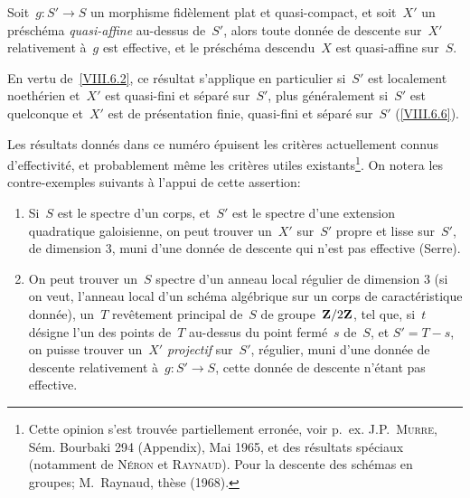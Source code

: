 \begin{corollaire}
\label{VIII.7.9}
Soit~$g\colon S'\to S$ un morphisme fid\`element plat et
quasi-compact, et soit~$X'$ un pr\'esch\'ema \emph{quasi-affine}
au-dessus de~$S'$, alors toute donn\'ee de descente sur~$X'$
relativement \`a~$g$ est effective, et le pr\'esch\'ema
descendu~$X$ est quasi-affine sur~$S$.
\end{corollaire}

En vertu de~\ref{VIII.6.2}, ce r\'esultat s'applique en particulier
si~$S'$ est localement noeth\'erien et~$X'$ est quasi-fini et
s\'epar\'e sur~$S'$, plus g\'en\'eralement si~$S'$ est
quelconque et~$X'$ est de pr\'esentation finie, quasi-fini et
s\'epar\'e sur~$S'$ (\cf \ref{VIII.6.6}).

\begin{remarques}
\label{VIII.7.10}
Les r\'esultats donn\'es dans ce num\'ero \'epuisent les
crit\`eres actuellement connus d'effectivit\'e, et probablement
m\^eme les crit\`eres utiles existants\footnote{Cette opinion
s'est trouv\'ee partiellement erron\'ee, voir p.\, ex. J.P.\, \textsc{Murre},
S\'em. Bourbaki 294 (Appendix), Mai 1965, et des r\'esultats
sp\'eciaux (notamment de \textsc{Néron} et \textsc{Raynaud}). Pour la descente des
sch\'emas en groupes; \cf M.\, Raynaud, th\`ese (1968).}. On notera
les contre-exemples suivants \`a l'appui de cette assertion:
\begin{enumerate}
\item[(i)]
Si~$S$ est le spectre d'un corps, et~$S'$ est le spectre d'une
extension quadratique galoisienne, on peut trouver un~$X'$ sur~$S'$
propre et lisse sur~$S'$, de dimension 3, muni d'une donn\'ee de
descente qui n'est pas effective (Serre).
\item[(ii)] On peut trouver un~$S$ spectre d'un anneau local
r\'egulier de dimension 3 (si on veut, l'anneau local d'un
sch\'ema alg\'ebrique sur un corps de caract\'eristique
donn\'ee), un~$T$ rev\^etement principal de~$S$ de
groupe~$\mathbf{Z}/2\mathbf{Z}$, tel que, si~$t$ d\'esigne l'un des points de~$T$
au-dessus du point ferm\'e~$s$ de~$S$, et $S'=T-s$, on puisse
trouver un~$X'$ \emph{projectif} sur~$S'$, r\'egulier, muni d'une
donn\'ee de descente relativement \`a~$g\colon S'\to S$, cette
donn\'ee de descente n'\'etant pas effective.
\end{enumerate}


\end{remarques}
